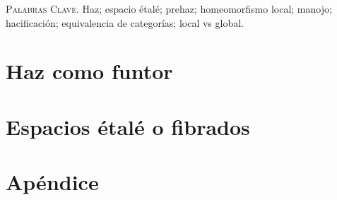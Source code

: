 \documentclass[letterpaper]{article} %
\date{}
\renewenvironment{abstract}
{\small
   \list{}{%
      \setlength{\leftmargin}{1.4cm}%
      \setlength{\rightmargin}{\leftmargin}%
   }%
   \item\relax}
{\endlist}
\begin{document}
   
   \vspace{1cm}

   \begin{abstract}
      
        
      \vspace{0.3cm}
      \textsc{Palabras Clave.} Haz; espacio étalé; prehaz; homeomorfismo local; manojo; hacificación; equivalencia de categorías; local vs global.
   \end{abstract}

   \vspace{1cm}

   \tableofcontents

   \section{Haz como funtor}
      
   \section{Espacios étalé o fibrados}
      
   \section{Apéndice}\label{section:Apendice}
      
 
   \newpage
   \nocite{*}
   
   
\end{document}
